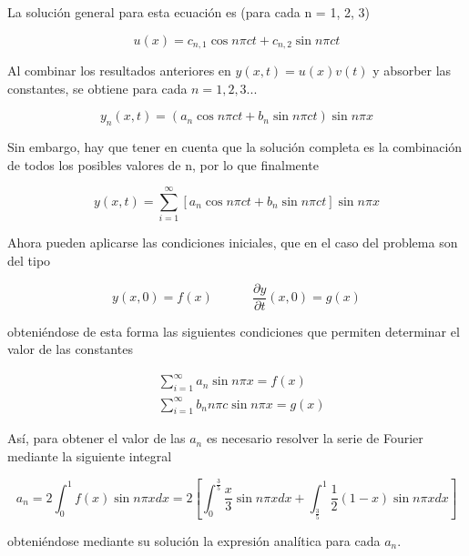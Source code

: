 \documentclass[11pt]{article}
\begin{document}
La solución general para esta ecuación es (para cada n = 1, 2, 3)

\begin{equation}
	u(x) = c_{n,1}\cos{n\pi{c}t} + c_{n,2}\sin{n\pi{c}t}
\end{equation}

Al combinar los resultados anteriores en $y(x,t) = u(x)v(t)$ y absorber las constantes, se
obtiene para cada $n = 1, 2, 3 ...$

\begin{equation}
	y_n(x,t) = (a_n\cos{n\pi{c}t} + b_n\sin{n\pi{c}t})\sin{n\pi{x}}
\end{equation}

Sin embargo, hay que tener en cuenta que la solución completa es la combinación de todos
los posibles valores de n, por lo que finalmente

\begin{equation}
	y(x,t) = \sum\limits_{i=1}^\infty[a_n\cos{n\pi{c}t} + b_n\sin{n\pi{c}t}]\sin{n\pi{x}}
\label{eq:sol_analitica}
\end{equation}

Ahora pueden aplicarse las condiciones iniciales, que en el caso del problema son del tipo

\begin{equation}
	y(x, 0) = f(x)~~~~~~~~~~~~~~\frac{\partial{y}}{\partial{t}}(x, 0) = g(x)
\end{equation}

obteniéndose de esta forma las siguientes condiciones que permiten determinar el valor de
las constantes

\begin{subequations}
\begin{flalign}
	&\sum\limits_{i=1}^\infty a_n \sin{n\pi{x}} = f(x)\\
	&\sum\limits_{i=1}^\infty b_n n\pi{c} \sin{n\pi{x}} = g(x)
\end{flalign}
\end{subequations}

Así, para obtener el valor de las $a_n$ es necesario resolver la serie de Fourier mediante
la siguiente integral

\begin{equation}
	a_n = 2 \int_0^1 f(x) \sin{n\pi{x}}dx = 2[\int_0^\frac{3}{5} \frac{x}{3} \sin{n\pi{x}}dx
	+ \int_{\frac{3}{5}}^1 \frac{1}{2}(1-x) \sin{n\pi{x}}dx]
\end{equation}

obteniéndose mediante su solución la expresión analítica para cada $a_n$.
\end{document}
